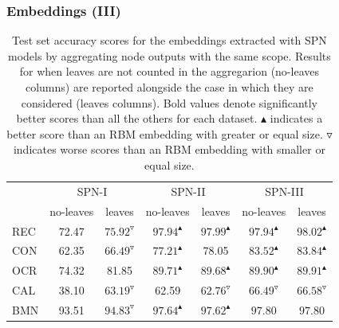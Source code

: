 \documentclass[10pt, t, xcolor={usenames,dvipsnames,svgnames}, compress]{beamer}
\begin{document}
\begin{frame}
  \frametitle{Embeddings (III)}
  \begin{table}[!t]
    \centering
    \footnotesize
    \caption[datasets]{Test set accuracy scores for the embeddings
      extracted with \textsf{SPN} models by aggregating node outputs
      with the same scope.
      Results for when leaves are not counted in the aggregarion
      (\textsf{no-leaves} columns) are reported alongside the case in which they are
      considered (\textsf{leaves} columns).
      Bold values denote significantly better scores than all the others
      for each dataset.
      $\blacktriangle$ indicates a better score than an RBM embedding
      with greater or equal size. $\triangledown$ indicates worse
      scores than an RBM embedding with smaller or equal size.}
    \setlength{\tabcolsep}{3pt}  
    \begin{tabular}{l c c c c c c}
      \toprule
      & \multicolumn{2}{c}{\textsf{SPN-I}} &
                                             \multicolumn{2}{c}{\textsf{SPN-II}}
      & \multicolumn{2}{c}{\textsf{SPN-III}}\\
      
      &no-leaves  & leaves& no-leaves& leaves& no-leaves& leaves\\
      \midrule
      \textsf{REC} & 72.47 & $75.92^{\triangledown}$ & $\mathbf{97.94}^{\blacktriangle}$ & $\mathbf{97.99}^{\blacktriangle}$ & $\mathbf{97.94}^{\blacktriangle}$ & $\mathbf{98.02}^{\blacktriangle}$ \\
      \midrule
      \textsf{CON} & 62.35 & $66.49^{\triangledown}$ & $77.21^{\blacktriangle}$ & 78.05 & $\mathbf{83.52}^{\blacktriangle}$ & $\mathbf{83.84}^{\blacktriangle}$ \\
      \midrule
      \textsf{OCR} & 74.32 & 81.85 & $89.71^{\blacktriangle}$ & $89.68^{\blacktriangle}$ & $\mathbf{89.90}^{\blacktriangle}$ & $\mathbf{89.91}^{\blacktriangle}$ \\
      \midrule
      \textsf{CAL} & 38.10 & $63.19^{\triangledown}$  & 62.59 & $62.76^{\triangledown}$ & $\mathbf{66.49}^{\triangledown}$ & $\mathbf{66.58}^{\triangledown}$ \\
      \midrule
      \textsf{BMN} & 93.51 & $94.83^{\triangledown}$ & $97.64^{\blacktriangle}$ & $97.62^{\blacktriangle}$ & $\mathbf{97.80}$ & $\mathbf{97.80}$ \\
      \bottomrule
    \end{tabular}
    \label{tab:model-scope-aggr}
  \end{table}
\end{frame}
\end{document}
